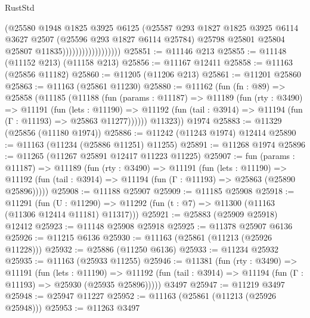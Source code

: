 \begin{lexlean}{RustStd}
\begin{coremodule}
                                    (@25580
                                      @1948
                                      @1825
                                      @3925
                                      @6125
                                      (@25587
                                        @293
                                        @1827
                                        @1825
                                        @3925
                                        @6114
                                        @3627
                                        @2507
                                        (@25596 @293 @1827 @6114 @25784)
                                        @25798
                                        @25801
                                        @25804
                                        @25807
                                        @11835))))))))))))))))))
@25851 := @11146 @213
@25855 := @11148 (@11152 @213) (@11158 @213)
@25856 := @11167 @12411
@25858 := @11163 (@25856 @11182)
@25860 := @11205 (@11206 @213)
@25861 := @11201 @25860
@25863 := @11163 (@25861 @11230)
@25880 := @11162
    (fun (fn : @89) =>
    @25858
      (@11185
        (@11188
          (fun (params : @11187) =>
          @11189
            (fun (rty : @3490) =>
            @11191
              (fun (lets : @11190) =>
              @11192 (fun (tail : @3914) => @11194 (fun (Γ : @11193) => @25863 @11277))))))
        @11323))
    @1974
@25883 := @11329 (@25856 (@11180 @1974))
@25886 := @11242 (@11243 @1974) @12414
@25890 := @11163 (@11234 (@25886 @11251) @11255)
@25891 := @11268 @1974
@25896 := @11265 (@11267 @25891 @12417 @11223 @11225)
@25907 := fun (params : @11187) =>
  @11189
    (fun (rty : @3490) =>
    @11191
      (fun (lets : @11190) =>
      @11192 (fun (tail : @3914) => @11194 (fun (Γ : @11193) => @25863 (@25890 @25896)))))
@25908 := @11188 @25907
@25909 := @11185 @25908
@25918 := @11291
    (fun (U : @11290) => @11292 (fun (t : @7) => @11300 (@11163 (@11306 @12414 @11181) @11317)))
@25921 := @25883 (@25909 @25918) @12412
@25923 := @11148 @25908 @25918
@25925 := @11378 @25907 @6136
@25926 := @11215 @6136
@25930 := @11163 (@25861 (@11213 (@25926 @11228)))
@25932 := @25886 (@11250 @6136)
@25933 := @11234 @25932
@25935 := @11163 (@25933 @11255)
@25946 := @11381
    (fun (rty : @3490) =>
    @11191
      (fun (lets : @11190) =>
      @11192 (fun (tail : @3914) => @11194 (fun (Γ : @11193) => @25930 (@25935 @25896)))))
    @3497
@25947 := @11219 @3497
@25948 := @25947 @11227
@25952 := @11163 (@25861 (@11213 (@25926 @25948)))
@25953 := @11263 @3497

\end{coremodule}
\end{lexlean}
